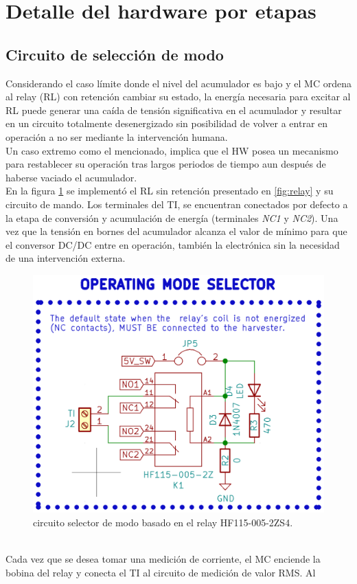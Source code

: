 \section{Detalle del hardware por etapas}
\subsection{Circuito de selección de modo}
Considerando el caso límite donde el nivel del acumulador es bajo y el MC ordena al relay (RL) con retención cambiar su estado, la energía necesaria para excitar al RL puede generar una caída de tensión significativa en el acumulador y resultar en un circuito totalmente desenergizado sin posibilidad de volver a entrar en operación a no ser mediante la intervención humana.\\
Un caso extremo como el mencionado, implica que el HW posea un mecanismo para restablecer su operación tras largos periodos de tiempo aun después de haberse vaciado el acumulador.\\
En la figura \ref{fig:ctoselecciondemodo} se implementó el RL sin retención presentado en \ref{fig:relay} y su circuito de mando. Los terminales del TI, se encuentran conectados por defecto a la etapa de conversión y acumulación de energía (terminales \textit{NC1} y \textit{NC2}). Una vez que la tensión en bornes del acumulador alcanza el valor de mínimo para que el conversor DC/DC entre en operación, también la electrónica sin la necesidad de una intervención externa.\\
\begin{figure}[h]
	\centering
	\includegraphics[width=0.7\linewidth]{Figures/cto_seleccion_de_modo}
	\caption{circuito selector de modo basado en el relay HF115-005-2ZS4.}
	\label{fig:ctoselecciondemodo}
\end{figure}\\
Cada vez que se desea tomar una medición de corriente, el MC enciende la bobina del relay y conecta el TI al circuito de medición de valor RMS. Al \\

